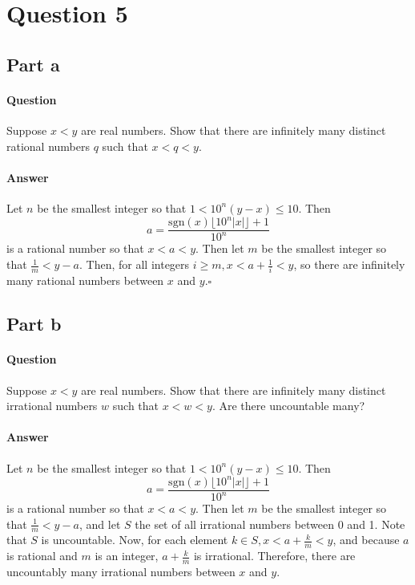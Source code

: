 \documentclass{article}
\begin{document}
\section{Question 5}
\subsection{Part a}
\paragraph{Question} Suppose $x < y$ are real numbers. Show that there are infinitely many distinct rational numbers $q$ such that $x < q < y$.
\paragraph{Answer}
Let $n$ be the smallest integer so that $1 < 10^n(y-x)\leq 10$. Then 
\begin{equation*}
    a = \frac{\textrm{sgn}(x)\lfloor10^n|x|\rfloor+1}{10^n}
\end{equation*} 
\noindent is a rational number so that $x < a < y$. Then let $m$ be the smallest integer so that $\frac{1}{m} < y-a$. Then, for all integers $i\geq m, x < a+\frac{1}{i} < y$, so there are infinitely many rational numbers between $x$ and $y. \square$
\subsection{Part b}
\paragraph{Question} Suppose $x < y$ are real numbers. Show that there are infinitely many distinct irrational numbers $w$ such that $x < w < y$. Are there uncountable many?
\paragraph{Answer}
Let $n$ be the smallest integer so that $1 < 10^n(y-x)\leq 10$. Then 
\begin{equation*}
    a = \frac{\textrm{sgn}(x)\lfloor10^n|x|\rfloor+1}{10^n}
\end{equation*} 
\noindent is a rational number so that $x < a < y$. Then let $m$ be the smallest integer so that $\frac{1}{m} < y-a$, and let $S$ the set of all irrational numbers between 0 and 1. Note that $S$ is uncountable. Now, for each element $k \in S, x < a + \frac{k}{m} < y$, and because $a$ is rational and $m$ is an integer, $a+\frac{k}{m}$ is irrational. Therefore, there are uncountably many irrational numbers between $x$ and $y$.  
\pagebreak
\end{document}
